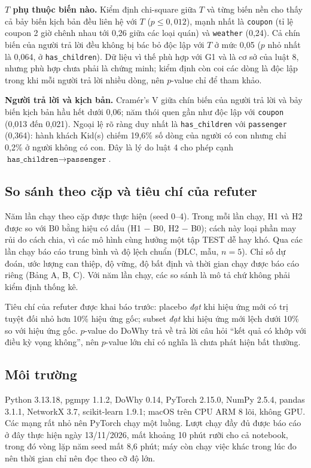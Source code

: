 \documentclass[pdflatex,sn-mathphys-num]{sn-jnl}%
\newcommand{\var}[1]{\texttt{#1}}                 %
\begin{document}
\textbf{$T$ phụ thuộc biến nào.} Kiểm định chi-square giữa $T$ và từng biến nền cho thấy cả bảy biến kịch bản đều liên hệ với $T$ ($p \le 0{,}012$), mạnh nhất là \var{coupon} (tỉ lệ coupon 2 giờ chênh nhau tới 0,26 giữa các loại quán) và \var{weather} (0,24). Cả chín biến của người trả lời đều không bị bác bỏ độc lập với $T$ ở mức 0,05 ($p$ nhỏ nhất là 0,064, ở \var{has\_children}). Dữ liệu vì thế phù hợp với G1 và là cơ sở của luật 8, nhưng phù hợp chưa phải là chứng minh; kiểm định còn coi các dòng là độc lập trong khi mỗi người trả lời nhiều dòng, nên $p$-value chỉ để tham khảo.

\textbf{Người trả lời và kịch bản.} Cramér's V giữa chín biến của người trả lời và bảy biến kịch bản hầu hết dưới 0,06; năm thói quen gần như độc lập với \var{coupon} (0,013 đến 0,021). Ngoại lệ rõ ràng duy nhất là \var{has\_children} với \var{passenger} (0,364): hành khách Kid(s) chiếm 19,6\% số dòng của người có con nhưng chỉ 0,2\% ở người không có con. Đây là lý do luật 4 cho phép cạnh $\var{has\_children} \to \var{passenger}$.

\subsection{So sánh theo cặp và tiêu chí của refuter}

Năm lần chạy theo cặp được thực hiện (seed 0--4). Trong mỗi lần chạy, H1 và H2 được so với B0 bằng hiệu có dấu (H1 $-$ B0, H2 $-$ B0); cách này loại phần may rủi do cách chia, vì các mô hình cùng hưởng một tập TEST dễ hay khó. Qua các lần chạy báo cáo trung bình và độ lệch chuẩn (ĐLC, mẫu, $n=5$). Chỉ số dự đoán, ước lượng can thiệp, độ vững, độ bất định và thời gian chạy được báo cáo riêng (Bảng A, B, C). Với năm lần chạy, các so sánh là mô tả chứ không phải kiểm định thống kê.

Tiêu chí của refuter được khai báo trước: placebo \emph{đạt} khi hiệu ứng mới có trị tuyệt đối nhỏ hơn 10\% hiệu ứng gốc; subset \emph{đạt} khi hiệu ứng mới lệch dưới 10\% so với hiệu ứng gốc. $p$-value do DoWhy trả về trả lời câu hỏi ``kết quả có khớp với điều kỳ vọng không'', nên $p$-value lớn chỉ có nghĩa là chưa phát hiện bất thường.

\subsection{Môi trường}

Python 3.13.18, pgmpy 1.1.2, DoWhy 0.14, PyTorch 2.15.0, NumPy 2.5.4, pandas 3.1.1, NetworkX 3.7, scikit-learn 1.9.1; macOS trên CPU ARM 8 lõi, không GPU. Các mạng rất nhỏ nên PyTorch chạy một luồng. Lượt chạy đầy đủ được báo cáo ở đây thực hiện ngày 13/11/2026, mất khoảng 10 phút rưỡi cho cả notebook, trong đó vòng lặp năm seed mất 8,6 phút; máy còn chạy việc khác trong lúc đo nên thời gian chỉ nên đọc theo cỡ độ lớn.
\end{document}
